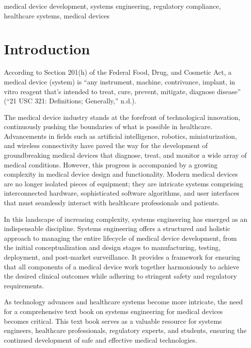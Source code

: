 \documentclass[conference]{IEEEtran}
\begin{document}
\begin{IEEEkeywords}
    medical device development, systems engineering, regulatory compliance,
    healthcare systems, medical devices
\end{IEEEkeywords}

\section{Introduction}
    According to Section 201(h) of the Federal Food, Drug, and Cosmetic Act, 
    a medical device (system) is “any instrument, machine, contrivance, implant, 
    in vitro reagent that’s intended to treat, cure, prevent, mitigate, 
    diagnose disease” (“21 USC 321: Definitions; Generally,” n.d.).

    The medical device industry stands at the forefront of technological 
    innovation, continuously pushing the boundaries of what is possible in 
    healthcare. Advancements in fields such as artificial intelligence, 
    robotics, miniaturization, and wireless connectivity have paved the way 
    for the development of groundbreaking medical devices that diagnose, 
    treat, and monitor a wide array of medical conditions. However, this 
    progress is accompanied by a growing complexity in medical device design 
    and functionality. Modern medical devices are no longer isolated pieces of 
    equipment; they are intricate systems comprising interconnected hardware, 
    sophisticated software algorithms, and user interfaces that must seamlessly 
    interact with healthcare professionals and patients.

    In this landscape of increasing complexity, systems engineering has 
    emerged as an indispensable discipline. Systems engineering offers a 
    structured and holistic approach to managing the entire lifecycle of 
    medical device development, from the initial conceptualization and design 
    stages to manufacturing, testing, deployment, and post-market surveillance. 
    It provides a framework for ensuring that all components of a medical 
    device work together harmoniously to achieve the desired clinical outcomes 
    while adhering to stringent safety and regulatory requirements.

    As technology advances and healthcare systems become more intricate, 
    the need for a comprehensive text book on systems engineering for medical 
    devices becomes critical. This text book serves as a valuable resource for 
    systems engineers, healthcare professionals, regulatory experts, and 
    students, ensuring the continued development of safe and effective medical 
    technologies.
\end{document}
